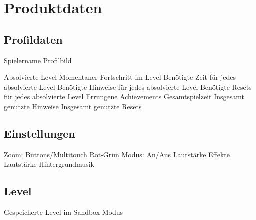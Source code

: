 \chapter{Produktdaten}

\section{Profildaten}
\begin{requirements}
	\begin{requirements}
		 Spielername
		 Profilbild
	\end{requirements}
	
	\req [Spielfortschritt] {D20}
	\begin{requirements}
		 Absolvierte Level
		 Momentaner Fortschritt im Level
		 Benötigte Zeit für jedes absolvierte Level
		 Benötigte Hinweise für jedes absolvierte Level
		 Benötigte Resets für jedes absolvierte Level
		 Errungene Achievements
		 Gesamtspielzeit
		 Insgesamt genutzte Hinweise
		 Insgesamt genutzte Resets
	\end{requirements}
\end{requirements}

\section{Einstellungen}
\begin{requirements}
	 Zoom: Buttons/Multitouch
	 Rot-Grün Modus: An/Aus
	 Lautstärke Effekte
	 Lautstärke Hintergrundmusik
	
\end{requirements}

\section{Level}
\begin{requirements}
	 Gespeicherte Level im Sandbox Modus
\end{requirements}
	
